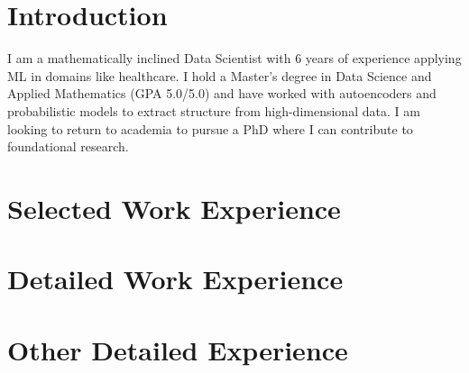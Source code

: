 \documentclass[11pt,a4paper]{moderncv}
\begin{document}
\makecvtitle

\section*{Introduction}
I am a mathematically inclined Data Scientist with 6 years of experience applying ML in domains like healthcare. I hold a Master's degree in Data Science and Applied Mathematics (GPA 5.0/5.0) and have worked with autoencoders and probabilistic models to extract structure from high-dimensional data. I am looking to return to academia to pursue a PhD where I can contribute to foundational research.



\section{Selected Work Experience}






\newpage
\section{Detailed Work Experience}





\section{Other Detailed Experience}

\end{document}
